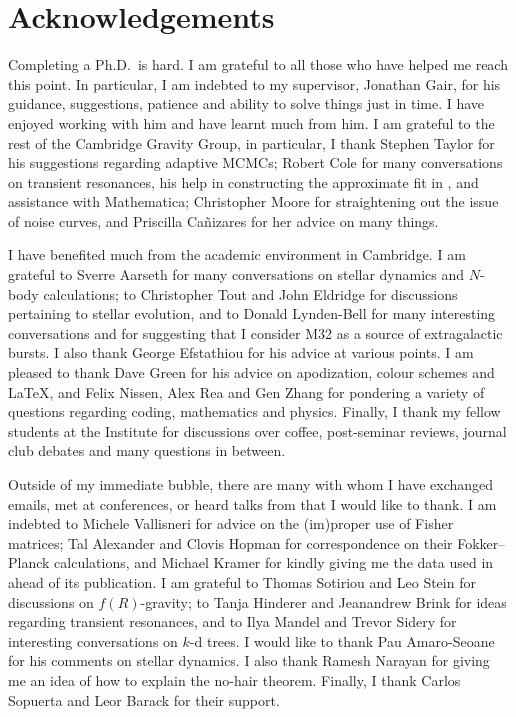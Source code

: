 \chapter*{Acknowledgements}
\label{acknowledgements}

Completing a Ph.D.\ is hard. I am grateful to all those who have helped me reach this point. In particular, I am indebted to my supervisor, Jonathan Gair, for his guidance, suggestions, patience and ability to solve things just in time. I have enjoyed working with him and have learnt much from him. I am grateful to the rest of the Cambridge Gravity Group, in particular, I thank Stephen Taylor for his suggestions regarding adaptive MCMCs; Robert Cole for many conversations on transient resonances, his help in constructing the approximate fit in , and assistance with Mathematica; Christopher Moore for straightening out the issue of noise curves, and Priscilla Ca\~{n}izares for her advice on many things.

I have benefited much from the academic environment in Cambridge. I am grateful to Sverre Aarseth for many conversations on stellar dynamics and $N$-body calculations; to Christopher Tout and John Eldridge for discussions pertaining to stellar evolution, and to Donald Lynden-Bell for many interesting conversations and for suggesting that I consider M32 as a source of extragalactic bursts. I also thank George Efstathiou for his advice at various points. I am pleased to thank Dave Green for his advice on apodization, colour schemes and \LaTeX, and Felix Nissen, Alex Rea and Gen Zhang for pondering a variety of questions regarding coding, mathematics and physics. Finally, I thank my fellow students at the Institute for discussions over coffee, post-seminar reviews, journal club debates and many questions in between.

Outside of my immediate bubble, there are many with whom I have exchanged emails, met at conferences, or heard talks from that I would like to thank. I am indebted to Michele Vallisneri for advice on the (im)proper use of Fisher matrices; Tal Alexander and Clovis Hopman for correspondence on their Fokker--Planck calculations, and Michael Kramer for kindly giving me the data used in  ahead of its publication. I am grateful to Thomas Sotiriou and Leo Stein for discussions on $f(R)$-gravity; to Tanja Hinderer and Jeanandrew Brink for ideas regarding transient resonances, and to Ilya Mandel and Trevor Sidery for interesting conversations on $k$-d trees. I would like to thank Pau Amaro-Seoane for his comments on stellar dynamics. I also thank Ramesh Narayan for giving me an idea of how to explain the no-hair theorem. Finally, I thank Carlos Sopuerta and Leor Barack for their support.

